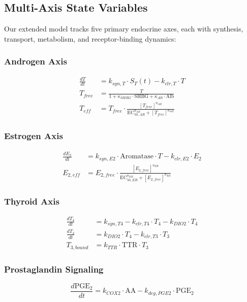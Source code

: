 \documentclass[11pt]{article}
\begin{document}
\subsection{Multi-Axis State Variables}

Our extended model tracks five primary endocrine axes, each with synthesis, transport, metabolism, and receptor-binding dynamics:

\subsubsection{Androgen Axis}
\begin{align}
\frac{dT}{dt} &= k_{syn,T} \cdot S_T(t) - k_{clr,T} \cdot T \\
T_{free} &= \frac{T}{1 + \kappa_{SHBG} \cdot \text{SHBG} + \kappa_{Alb} \cdot \text{Alb}} \\
T_{eff} &= T_{free} \cdot \frac{[T_{free}]^{n_{AR}}}{\text{EC}_{50,AR}^{n_{AR}} + [T_{free}]^{n_{AR}}}
\end{align}

\subsubsection{Estrogen Axis}
\begin{align}
\frac{dE_2}{dt} &= k_{syn,E2} \cdot \text{Aromatase} \cdot T - k_{clr,E2} \cdot E_2 \\
E_{2,eff} &= E_{2,free} \cdot \frac{[E_{2,free}]^{n_{ER}}}{\text{EC}_{50,ER}^{n_{ER}} + [E_{2,free}]^{n_{ER}}}
\end{align}

\subsubsection{Thyroid Axis}
\begin{align}
\frac{dT_4}{dt} &= k_{syn,T4} - k_{clr,T4} \cdot T_4 - k_{DIO2} \cdot T_4 \\
\frac{dT_3}{dt} &= k_{DIO2} \cdot T_4 - k_{clr,T3} \cdot T_3 \\
T_{3,bound} &= k_{TTR} \cdot \text{TTR} \cdot T_3
\end{align}

\subsubsection{Prostaglandin Signaling}
\begin{equation}
\frac{d\text{PGE}_2}{dt} = k_{COX2} \cdot \text{AA} - k_{deg,PGE2} \cdot \text{PGE}_2
\end{equation}
\end{document}

